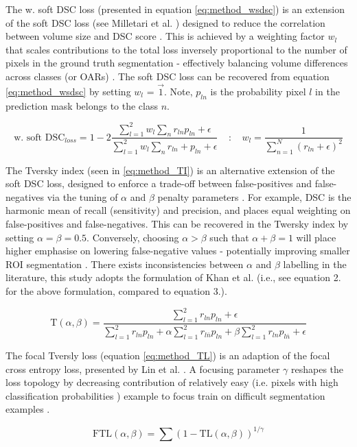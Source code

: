 The w. soft DSC loss (presented in equation \ref{eq:method_wsdsc}) is an
extension of the soft DSC loss (see Milletari et al. \cite{milletari2016})
designed to reduce the correlation between volume size and DSC score
\cite{Sudre_2017}. This is achieved by a weighting factor $w_{l}$ that scales
contributions to the total loss inversely proportional to the number of pixels
in the ground truth segmentation - effectively balancing volume differences
across classes (or OARs) \cite{Sudre_2017}. The soft DSC loss can be recovered
from equation \ref{eq:method_wsdsc} by setting $w_{l}$ = $\vec{1}$. Note,
$p_{ln}$ is the probability pixel $l$ in the prediction mask belongs to the
class $n$.

\begin{equation}
\textrm{w. soft DSC$_{loss}$} = 1-2\frac{\sum_{l=1}^{2}w_{l}\sum_{n}r_{ln}p_{ln} + \epsilon}{\sum_{l=1}^{2}w_{l}\sum_{n}r_{ln} + p_{ln} + \epsilon} \; \;  \; \; \textbf{:} \; \; \; \; w_{l} = \frac{1}{\sum_{n=1}^{N}(r_{ln} + \epsilon)^2}
\label{eq:method_wsdsc}
\end{equation}
%


The Tversky index (seen in \ref{eq:method_TI}) is an alternative extension of
the soft DSC loss, designed to enforce a trade-off between false-positives and
false-negatives via the tuning of $\alpha$ and $\beta$ penalty parameters
\cite{Khan2019}. For example, DSC is the harmonic mean of recall (sensitivity)
and precision, and places equal weighting on false-positives and
false-negatives. This can be recovered in the Twersky index by setting $\alpha =
\beta = 0.5$. Conversely, choosing $\alpha > \beta$ such that $\alpha + \beta =
1$ will place higher emphasise on lowering false-negative values - potentially
improving smaller ROI segmentation \cite{Khan2019}. There exists inconsistencies
between $\alpha$ and $\beta$ labelling in the literature, this study adopts the
formulation of Khan et al. \cite{Khan2019} (i.e., see \cite{Khan2019} equation
2. for the above formulation, compared to \cite{salehi2017tversky} equation 3.).

\begin{equation}
\textrm{T}(\alpha, \beta) = \frac{\sum_{l=1}^{2}r_{ln}p_{ln} + \epsilon}{
\sum_{l=1}^{2}r_{ln}p_{ln} +
\alpha\sum_{l=1}^{2}r_{l\bar{n}}p_{ln} +
\beta\sum_{l=1}^{2}r_{ln}p_{l\bar{n}} + \epsilon	
}
\label{eq:method_TI}
\end{equation}

The focal Tversly loss (equation \ref{eq:method_TL}) is an adaption of the focal
cross entropy loss, presented by Lin et al. \cite{lin2017focal}. A focusing
parameter $\gamma$ reshapes the loss topology by decreasing contribution of
relatively easy (i.e. pixels with high classification probabilities
\cite{Khan2019}) example to focus train on difficult segmentation examples
\cite{lin2017focal}.

\begin{equation}
\textrm{FTL}(\alpha, \beta) = \sum(1-\textrm{TL}(\alpha, \beta))^{1 / \gamma}
\label{eq:method_TL}
\end{equation}
